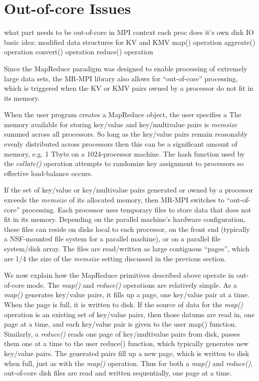 \section{Out-of-core Issues}
\label{sec:outcore}

  what part needs to be out-of-core in MPI context
  each proc does it's own disk IO
  basic idea: modified data structures for KV and KMV
  map() operation
  aggreate() operation
  convert() operation
  reduce() operation

Since the MapReduce paradigm was designed to enable processing of
extremely large data sets, the MR-MPI library also allows for
``out-of-core'' processing, which is triggered when the KV or KMV
pairs owned by a processor do not fit in its memory.

When the user program creates a MapReduce object, the user specifies
a 
The memory available for storing key/value and key/multivalue pairs is
{\it memsize} summed across all processors.  So long as the key/value
pairs remain reasonably evenly distributed across processors then this
can be a significant amount of memory, e.g. 1 Tbyte on a
1024-processor machine.  The hash function used by the {\it collate()}
operation attempts to randomize key assignment to processors so
effective load-balance occurs.



If the set of key/value or key/multivalue pairs generated or owned by
a processor exceeds the {\it memsize} of its allocated memory, then
MR-MPI switches to ``out-of-core'' processing.  Each processor uses
temporary files to store data that does not fit in its memory.
Depending on the parallel machine's hardware configuration, these
files can reside on disks local to each processor, on the front end
(typically a NSF-mounted file system for a parallel machine), or on a
parallel file system/disk array.  The files are read/written as large
contiguous ``pages'', which are 1/4 the size of the {\it memsize}
setting discussed in the previous section.

We now explain how the MapReduce primitives described above operate in
out-of-core mode.  The {\it map()} and {\it reduce()} operations are
relatively simple.  As a {\it map()} generates key/value pairs, it
fills up a page, one key/value pair at a time.  When the page is full,
it is written to disk.  If the source of data for the {\it map()}
operation is an existing set of key/value pairs, then those datums are
read in, one page at a time, and each key/value pair is given to the
user map() function.  Similarly, a {\it reduce()} reads one page of
key/multivalue pairs from disk, passes them one at a time to the user
reduce() function, which typically generates new key/value pairs.  The
generated pairs fill up a new page, which is written to disk when
full, just as with the {\it map()} operation.  Thus for both a {\it
map()} and {\it reduce()}, out-of-core disk files are read and written
sequentially, one page at a time.

